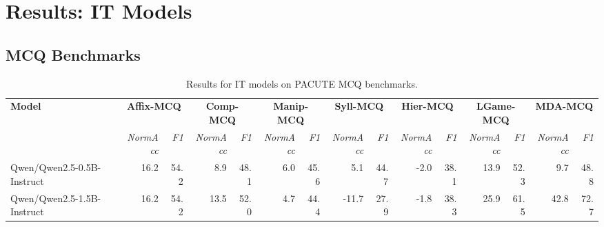 \documentclass{article}
\begin{document}
\section*{Results: IT Models}

\subsection*{MCQ Benchmarks}

\begin{table}[htbp]
\centering
\caption{Results for IT models on PACUTE MCQ benchmarks.}
\label{tab:results-it:mcq}
\begin{threeparttable}
\begin{adjustbox}{max width=\textwidth}
\begin{tabular}{lrrrrrrrrrrrrrr}
\toprule
\textbf{Model} & \multicolumn{2}{c}{\textbf{Affix-MCQ}} & \multicolumn{2}{c}{\textbf{Comp-MCQ}} & \multicolumn{2}{c}{\textbf{Manip-MCQ}} & \multicolumn{2}{c}{\textbf{Syll-MCQ}} & \multicolumn{2}{c}{\textbf{Hier-MCQ}} & \multicolumn{2}{c}{\textbf{LGame-MCQ}} & \multicolumn{2}{c}{\textbf{MDA-MCQ}} \\
\cmidrule(lr){2-3}\cmidrule(lr){4-5}\cmidrule(lr){6-7}\cmidrule(lr){8-9}\cmidrule(lr){10-11}\cmidrule(lr){12-13}\cmidrule(lr){14-15}
 & \textit{NormAcc} & \textit{F1} & \textit{NormAcc} & \textit{F1} & \textit{NormAcc} & \textit{F1} & \textit{NormAcc} & \textit{F1} & \textit{NormAcc} & \textit{F1} & \textit{NormAcc} & \textit{F1} & \textit{NormAcc} & \textit{F1} \\
\midrule
Qwen/Qwen2.5-0.5B-Instruct & \cellcolor[HTML]{FCEBE4}16.2 & \cellcolor[HTML]{FDF1EC}54.2 & \cellcolor[HTML]{F9D4C4}8.9 & \cellcolor[HTML]{FAD6C7}48.1 & \cellcolor[HTML]{F6BDA3}6.0 & \cellcolor[HTML]{F7C1A9}45.6 & \cellcolor[HTML]{FDF0EA}5.1 & \cellcolor[HTML]{FEFBFA}44.7 & \cellcolor[HTML]{FDF4F1}-2.0 & \cellcolor[HTML]{FEF7F4}38.1 & \cellcolor[HTML]{F4A582}13.9 & \cellcolor[HTML]{F4A582}52.3 & \cellcolor[HTML]{F4A684}9.7 & \cellcolor[HTML]{F4A785}48.8 \\
Qwen/Qwen2.5-1.5B-Instruct & \cellcolor[HTML]{FCEBE4}16.2 & \cellcolor[HTML]{FDF1EC}54.2 & \cellcolor[HTML]{C8E1EE}13.5 & \cellcolor[HTML]{C6E0ED}52.0 & \cellcolor[HTML]{F6B69A}4.7 & \cellcolor[HTML]{F6B99E}44.4 & \cellcolor[HTML]{F5AF90}-11.7 & \cellcolor[HTML]{F5B294}27.9 & \cellcolor[HTML]{FEF9F8}-1.8 & \cellcolor[HTML]{FEFCFB}38.3 & \cellcolor[HTML]{F7C1A9}25.9 & \cellcolor[HTML]{F8CAB6}61.5 & \cellcolor[HTML]{FEFCFB}42.8 & \cellcolor[HTML]{EFF6FA}72.7 \\

\end{tabular}
\end{adjustbox}
\end{threeparttable}
\end{table}
\end{document}
